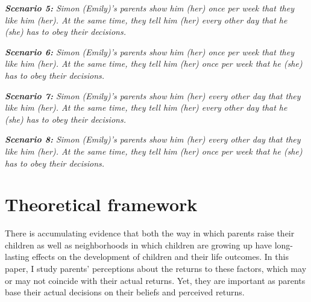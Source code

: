 \documentclass[12pt, a4paper, english]{article}
\begin{document}
\textit{\textbf{Scenario 5:} Simon (Emily)'s parents show him (her) once per week that they like him (her). At the same time, they tell him (her) every other day that he (she) has to obey their decisions.}

\textit{\textbf{Scenario 6:} Simon (Emily)'s parents show him (her) once per week that they like him (her). At the same time, they tell him (her) once per week that he (she) has to obey their decisions.}

\textit{\textbf{Scenario 7:} Simon (Emily)'s parents show him (her) every other day that they like him (her). At the same time, they tell him (her) every other day that he (she) has to obey their decisions.}

\textit{\textbf{Scenario 8:} Simon (Emily)'s parents show him (her) every other day that they like him (her). At the same time, they tell him (her) once per week that he (she) has to obey their decisions.}


\clearpage
\section{Theoretical framework}\label{app:theoreticalframework}
\setcounter{table}{0}
\setcounter{figure}{0}
\setcounter{footnote}{0}

There is accumulating evidence that both the way in which parents raise their children \citep[e.g.,][]{Deckersetal2017Balu,Cobb-Clark2018} as well as neighborhoods in which children are growing up \citep[e.g.,][]{ChettyHendren2018County,ChettyHendren2018Exposure} have long-lasting effects on the development of children and their life outcomes. In this paper, I study parents' perceptions about the returns to these factors, which may or may not coincide with their actual returns. Yet, they are important as parents base their actual decisions on their beliefs and perceived returns.
\end{document}
